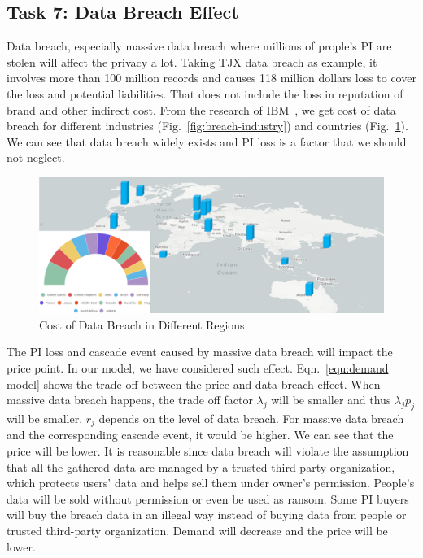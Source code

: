 \documentclass{mcmthesis}
\begin{document}
\subsection{Task 7: Data Breach Effect}
Data breach, especially massive data breach where millions of prople's PI are stolen will affect the privacy a lot. Taking TJX data breach as example, it involves more than 100 million records and causes 118 million dollars loss to cover the loss and potential liabilities. That does not include the loss in reputation of brand and other indirect cost. From the research of IBM~\cite{IBMreport}, we get cost of data breach for different industries (Fig.~\ref{fig:breach-industry}) and countries (Fig.~\ref{fig:breach-region}). We can see that data breach widely exists and PI loss is a factor that we should not neglect.

\begin{figure}
    \centering
    \includegraphics[width=\textwidth]{fig/map.png}
    \caption{Cost of Data Breach in Different Regions}
    \label{fig:breach-region}
\end{figure}

The PI loss and cascade event caused by massive data breach will impact the price point. In our model, we have considered such effect. Eqn.~\eqref{equ:demand model} shows the trade off between the price and data breach effect. When massive data breach happens, the trade off factor $\lambda_j$ will be smaller and thus $\lambda_j p_j$ will be smaller. $r_j$ depends on the level of data breach. For massive data breach and the corresponding cascade event, it would be higher. We can see that the price will be lower. It is reasonable since data breach will violate the assumption that all the gathered data are managed by a trusted third-party organization, which protects users' data and helps sell them under owner's permission. People's data will be sold without permission or even be used as ransom. Some PI buyers will buy the breach data in an illegal way instead of buying data from people or trusted third-party organization. Demand will decrease and the price will be lower.
\end{document}
